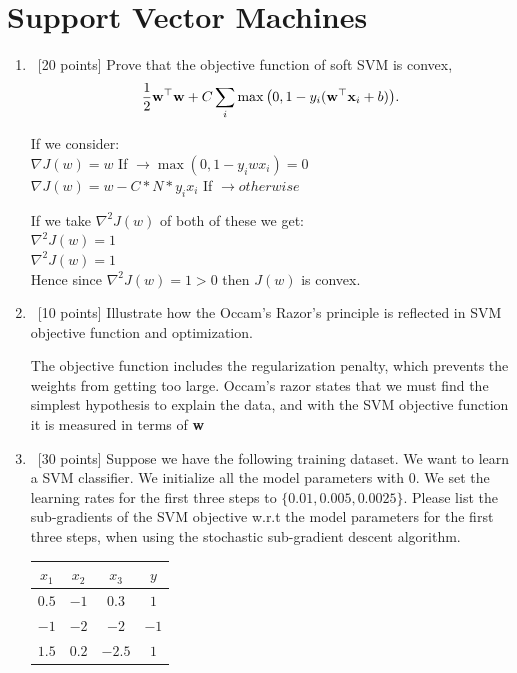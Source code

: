 \documentclass[12pt, fullpage,letterpaper]{article}
\begin{document}
\section{Support Vector Machines}
\begin{enumerate}
\item~[20 points] Prove that the objective function of soft SVM is convex,
\[
\frac{1}{2}{\bf w}^\top{\bf w} + C\sum_{i} \max\big(0, 1 - y_i({\bf w}^\top{\bf x}_i+b)\big).
\]

If we consider:\\
$\nabla J(w) = w $ If $\rightarrow \max(0, 1-y_i w x_i) = 0$\\
$\nabla J(w) = w - C * N * y_i x_i$ If $\rightarrow otherwise$

If we take $\nabla^2 J(w)$ of both of these we get:\\

$\nabla^2 J(w) = 1$\\
$\nabla^2 J(w) = 1$\\

Hence since $\nabla^2 J(w) = 1 > 0$ then $J(w)$ is convex.

\item~[10 points] Illustrate how the Occam's Razor's principle is reflected in SVM objective function and optimization. 

The objective function includes the regularization penalty, which prevents the weights
 from getting too large.
Occam's razor states that we must find the simplest
hypothesis to explain the data, and with the SVM objective function it is measured
in terms of \textbf{w}

\item~[30 points] Suppose we have the following training dataset. We want to learn a SVM classifier. We initialize all the model parameters with $0$. We set the learning rates for the first three steps to $\{0.01, 0.005, 0.0025\}$.  Please list the sub-gradients of the SVM objective w.r.t the model parameters for the first three steps, when using the stochastic sub-gradient descent algorithm. 
\begin{table}[h]
        \centering
        \begin{tabular}{ccc|c}
        $x_1$ & $x_2$ & $x_3$ &  $y$\\ 
        \hline\hline
         $0.5$ & $-1$ & $0.3$ & $1$ \\ \hline
         $-1$ & $-2$ & $-2$ & $-1$\\ \hline
         $1.5$ & $0.2$ & $-2.5$ & $1$\\ \hline
        \end{tabular}
\end{table}


\end{enumerate}
\end{document}
